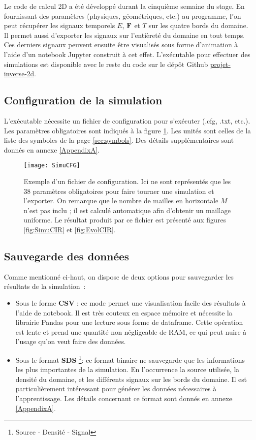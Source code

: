 Le code de calcul 2D a été développé durant la cinquième semaine du stage. En fournissant des paramètres (physiques, géométriques, etc.) au programme, l'on peut récupérer les signaux temporels $E$, $\mathbf{F}$ et $T$ sur les quatre bords du domaine. Il permet aussi d'exporter les signaux sur l'entièreté du domaine en tout temps. Ces derniers signaux peuvent ensuite être visualisés sous forme d'animation à l'aide d'un notebook Jupyter construit à cet effet. L'exécutable pour effectuer des simulations est disponible avec le reste du code sur le dépôt Github \href{https://github.com/desmond-rn/projet-inverse-2d}{projet-inverse-2d}.

\subsection{Configuration de la simulation}

L'exécutable nécessite un fichier de configuration pour s'exécuter (.cfg, .txt, etc.). Les paramètres obligatoires sont indiqués à la figure \ref{fig:SimuCFG}. Les unités sont celles de la liste des symboles de la page \ref{sec:symbols}. Des détails supplémentaires sont donnés en annexe \ref{AppendixA}.

\begin{figure}[!h]
\centering
\texttt{[image: SimuCFG]} 
\decoRule
\caption[SimuCFG]{Exemple d'un fichier de configuration. Ici ne sont représentés que les 38 paramètres obligatoires pour faire tourner une simulation et l'exporter. On remarque que le nombre de mailles en horizontale $M$ n'est pas inclu ; il est calculé automatique afin d'obtenir un maillage uniforme. Le résultat produit par ce fichier est présenté aux figures \ref{fig:SimuCIR} et \ref{fig:EvolCIR}.}
\label{fig:SimuCFG}
\end{figure}

\subsection{Sauvegarde des données}

Comme mentionné ci-haut, on dispose de deux options pour sauvegarder les résultats de la simulation :

\begin{itemize}
 \item Sous le forme \textbf{CSV} : ce mode permet une visualisation facile des résultats à l'aide de notebook. Il est très couteux en espace mémoire et nécessite la librairie Pandas pour une lecture sous forme de dataframe. Cette opération est lente et prend une quantité non négligeable de RAM, ce qui peut nuire à l'usage qu'on veut faire des données.
 
 \item Sous le format \textbf{SDS} \footnote{Source - Densité - Signal}: ce format binaire ne sauvegarde que les informations les plus importantes de la simulation. En l'occurrence la source utilisée, la densité du domaine, et les différents signaux sur les bords du domaine. Il est particulièrement intéressant pour générer les données nécessaires à l'apprentissage. Les détails concernant ce format sont donnés en annexe \ref{AppendixA}.
\end{itemize}

